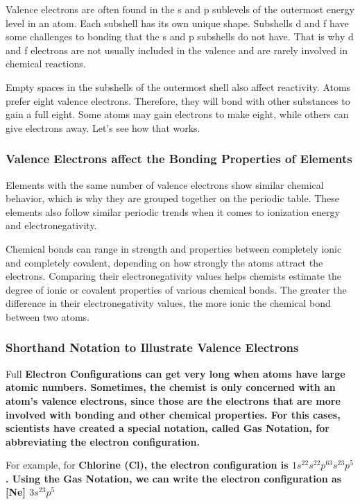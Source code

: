 Valence electrons are often found in the s and p sublevels of the outermost energy level in an atom. Each subshell has its own unique shape. Subshells d and f have some challenges to bonding that the s and p subshells do not have. That is why d and f electrons are not usually included in the valence and are rarely involved in chemical reactions.

Empty spaces in the subshells of the outermost shell also affect reactivity. Atoms prefer eight valence electrons. Therefore, they will bond with other substances to gain a full eight. Some atoms may gain electrons to make eight, while others can give electrons away. Let's see how that works.

\subsubsection*{Valence Electrons affect the Bonding Properties of Elements}

Elements with the same number of valence electrons show similar chemical behavior, which is why they are grouped together on the periodic table. These elements also follow similar periodic trends when it comes to ionization energy and electronegativity.

Chemical bonds can range in strength and properties between completely ionic and completely covalent, depending on how strongly the atoms attract the electrons. Comparing their electronegativity values helps chemists estimate the degree of ionic or covalent properties of various chemical bonds. The greater the difference in their electronegativity values, the more ionic the chemical bond between two atoms.

\subsubsection*{Shorthand Notation to Illustrate Valence Electrons}

Full \bf{Electron Configurations} can get very long when atoms have large atomic numbers. Sometimes, the chemist is only concerned with an atom's valence electrons, since those are the electrons that are more involved with bonding and other chemical properties. For this cases, scientists have created a special notation, called \bf{Gas Notation}, for abbreviating the electron configuration.

For example, for \bf{Chlorine (Cl)}, the electron configuration is $1s^22s^22p^63s^23p^5$. Using the \bf{Gas Notation}, we can write the electron configuration as \bf{[Ne] $3s^23p^5$}

